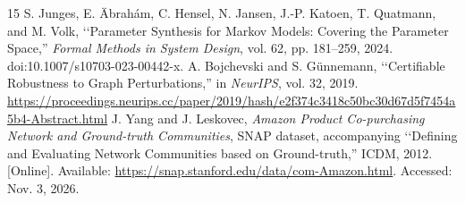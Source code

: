 \documentclass[conference]{IEEEtran}
\begin{document}
\begin{thebibliography}{15}
 S. Junges, E. \"Abrah\'am, C. Hensel, N. Jansen, J.-P. Katoen, T. Quatmann, and M. Volk, \lq\lq Parameter Synthesis for Markov Models: Covering the Parameter Space,'' \emph{Formal Methods in System Design}, vol. 62, pp. 181--259, 2024. doi:10.1007/s10703-023-00442-x.
 A. Bojchevski and S. G\"unnemann, \lq\lq Certifiable Robustness to Graph Perturbations,'' in \emph{NeurIPS}, vol. 32, 2019. \url{https://proceedings.neurips.cc/paper/2019/hash/e2f374c3418c50bc30d67d5f7454a5b4-Abstract.html}
 J. Yang and J. Leskovec, \emph{Amazon Product Co-purchasing Network and Ground-truth Communities}, SNAP dataset, accompanying \lq\lq Defining and Evaluating Network Communities based on Ground-truth,'' ICDM, 2012. [Online]. Available: \url{https://snap.stanford.edu/data/com-Amazon.html}. Accessed: Nov. 3, 2026.
\end{thebibliography}
\end{document}
